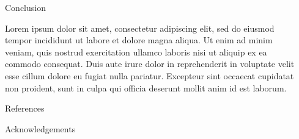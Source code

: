 \documentclass[final]{beamer}
\newlength{\sepwid}
\newlength{\onecolwid}
\begin{document}
\begin{frame}[t]
\begin{columns}[t]
\begin{column}{\onecolwid}

\begin{block}{Conclusion}

Lorem ipsum dolor sit amet, consectetur adipiscing elit, sed do eiusmod tempor incididunt ut labore et dolore magna aliqua. Ut enim ad minim veniam, quis nostrud exercitation ullamco laboris nisi ut aliquip ex ea commodo consequat. Duis aute irure dolor in reprehenderit in voluptate velit esse cillum dolore eu fugiat nulla pariatur. Excepteur sint occaecat cupidatat non proident, sunt in culpa qui officia deserunt mollit anim id est laborum.

\end{block}




\begin{block}{References}

\nocite{*} %
\small{
\vspace{0.75in}}

\end{block}



\begin{block}{Acknowledgements}

\small{} 

\end{block}






\end{column} %
\begin{column}{\sepwid}\end{column} %


\end{columns}
\end{frame}
\end{document}
